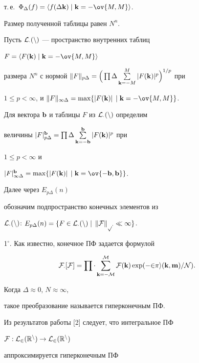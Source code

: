 т.\,е.~$\Phi_\Delta(f)=\la f(\Delta\bold k)\mid\bold k=- 


\ov{M,M}\ra$. 


Размер полученной таблицы равен $N^n$. 


Пусть $\cal L_\Delta(n)$ --- пространство внутренних таблиц 


$F=\la F(\bold k)\mid\bold k=-\ov{M,M}\ra$ 


размера $N^n$ с нормой $\|F\|_{p\Delta}=\Big(


\prod\Delta\sum\limits^M_{\bold k=-M}|F(\bold k)|^p\Big)^{1/p}$ при 


$1\le p<\infty$, и $\|F\|_{\infty\Delta}=\max\{|F(\bold k)|\,\mid 


\bold k=-\ov{M,M}\}$. 


Для вектора $\bold b$ и таблицы $F$ из $\cal L_\Delta(n)$ определим  


величины $|F|^{\bold b}_{p\Delta}=\prod\Delta 


\sum\limits^{\bold b}_{\bold k=-\bold b}|F(\bold k)|^p$ при 


$1\le p<\infty$ и 


$|F|^{\bold b}_{\infty\Delta}=\max\{|F(\bold k)|\,\mid 


\bold k=\ov{-\bold b,\bold b}\}$. 


Далее через $E_{p\Delta}(n)$ 


обозначим подпространство конечных элементов из  


$\cal L_\Delta(n)$: $E_{p\Delta}(n)=\{F\in\cal L_\Delta(n)\mid\, 


\|F\|_{p\Delta}\ll\infty\}$. 


 


1${}^\circ$. Как известно, конечное ПФ задается формулой 


$$ 


\cal F_\Delta[F]=\prod\Delta 


\sum^M_{\bold k=-M}F(\bold k)\exp 


(-2\pi i(\bold k,\bold m)/N). 


$$ 


Когда $\Delta\approx 0$, $N\approx\infty$, 


такое преобразование называется гиперконечным ПФ.  


Из результатов работы [2] следует, что интегральное ПФ 


$\cal F:L_2(\Bbb R^n)\to L_2(\Bbb R^n)$ 


аппроксимируется гиперконечным ПФ 


